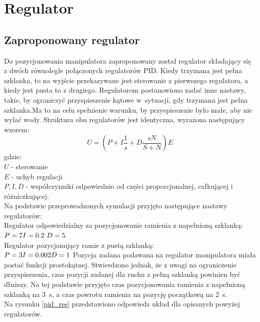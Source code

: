\chapter{Regulator}
\label{cha:regulator}

\section{Zaproponowany regulator}
Do pozycjonowania manipulatora zaproponowany został regulator składający się z dwóch równolegle połączonych regulatorów PID. Kiedy trzymana jest pełna szklanka, to na wyjście przekazywane jest sterowanie z pierwszego regulatora, a kiedy jest pusta to z drugiego. Regulatorom postanowiono zadać inne nastawy, takie, by ograniczyć przyspieszenie kątowe w~sytuacji, gdy trzymana jest pełna szklanka.Ma to na celu spełnienie warunku, by przyspieszenie było małe, aby nie wylać wody. Struktura obu regulatorów jest identyczna, wyrażona następujący wzorem:
\begin{equation}\label{key}
U = (P + I \frac{1}{s} + D\frac{sN}{S+N}) E
\end{equation}
gdzie:\\
$
U$ - sterowanie\\
$E$ - uchyb regulacji\\
$P, I, D$ - współczynniki odpowiednio od części proporcjonalnej, całkującej i różniczkującej.\\
Na podstawie przeprowadzonych symulacji przyjęto następujące nastawy regulatorów:\\
Regulator odpowiedzialny za pozycjonowanie ramienia z napełnioną szklanką:\\
$
P = 7\\
I = 0.2\\\
D = 5\\
$\\
Regulator pozycjonujący ramie z pustą szklanką:\\
$
P = 3\\
I = 0.002\\
D = 1\\
$
Pozycja zadana podawana na regulator manipulatora miała postać funkcji prostokątnej. Stwierdzono jednak, że z uwagi na ograniczenie przyspieszenia, czas pozycji zadanej dla ruchu z pełną szklanką powinien być dłuższy. Na tej podstawie przyjęto czas pozycjonowania ramienia z napełnioną szklanką na 3~s, a czas powrotu ramienia na pozycję początkową na 2~s.\\
Na rysunku \ref{pid_res} przedstawiono odpowiedz układ dla opisanych powyżej regulatorów.
